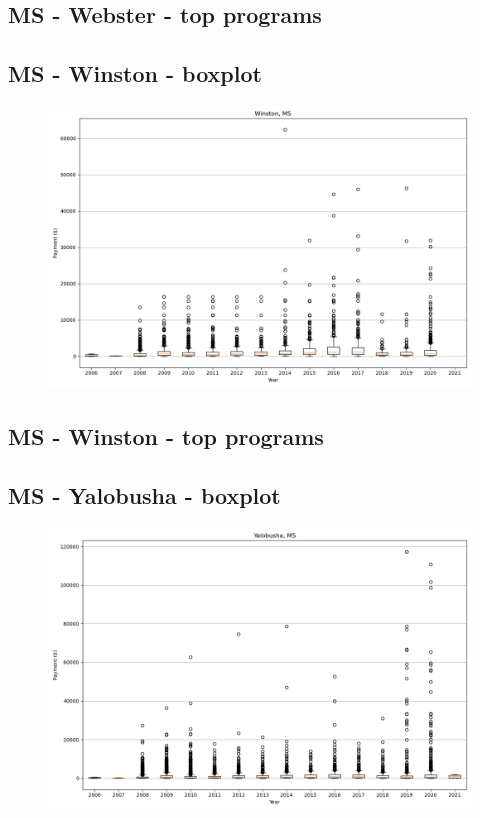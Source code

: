 \subsection*{MS - Webster - top programs}

\newpage
\subsection*{MS - Winston - boxplot}
\begin{figure}[h]
\centering
\includegraphics[width=7in]{../output/boxplots/counties/Winston-MS_boxplot.png}
\end{figure}


\subsection*{MS - Winston - top programs}

\newpage
\subsection*{MS - Yalobusha - boxplot}
\begin{figure}[h]
\centering
\includegraphics[width=7in]{../output/boxplots/counties/Yalobusha-MS_boxplot.png}
\end{figure}


